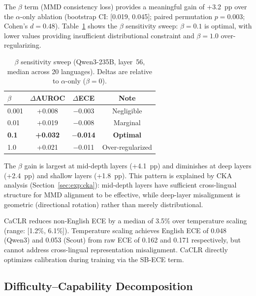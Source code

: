 \documentclass[11pt,a4paper]{article}
\begin{document}
The $\beta$ term (MMD consistency loss) provides a meaningful gain of +3.2~pp over the $\alpha$-only ablation (bootstrap CI: [0.019, 0.045]; paired permutation $p = 0.003$; Cohen's $d = 0.48$).
Table~\ref{tab:beta} shows the $\beta$ sensitivity sweep: $\beta = 0.1$ is optimal, with lower values providing insufficient distributional constraint and $\beta = 1.0$ over-regularizing.

\begin{table}[t]
\centering
\small
\begin{tabular}{@{}lccc@{}}
\toprule
$\beta$ & $\Delta$AUROC & $\Delta$ECE & Note \\
\midrule
0.001 & +0.008 & $-$0.003 & Negligible \\
0.01  & +0.019 & $-$0.008 & Marginal \\
\textbf{0.1} & \textbf{+0.032} & $\mathbf{-}$\textbf{0.014} & \textbf{Optimal} \\
1.0   & +0.021 & $-$0.011 & Over-regularized \\
\bottomrule
\end{tabular}
\caption{$\beta$ sensitivity sweep (Qwen3-235B, layer~56, median across 20 languages). Deltas are relative to $\alpha$-only ($\beta=0$).}
\label{tab:beta}
\end{table}

The $\beta$ gain is largest at mid-depth layers (+4.1~pp) and diminishes at deep layers (+2.4~pp) and shallow layers (+1.8~pp).
This pattern is explained by CKA analysis (Section~\ref{sec:exp:cka}): mid-depth layers have sufficient cross-lingual structure for MMD alignment to be effective, while deep-layer misalignment is geometric (directional rotation) rather than merely distributional.

CaCLR reduces non-English ECE by a median of 3.5\% over temperature scaling (range: [1.2\%, 6.1\%]).
Temperature scaling achieves English ECE of 0.048 (Qwen3) and 0.053 (Scout) from raw ECE of 0.162 and 0.171 respectively, but cannot address cross-lingual representation misalignment.
CaCLR directly optimizes calibration during training via the SB-ECE term.

\subsection{Difficulty--Capability Decomposition}
\label{sec:exp:decomp}
\end{document}
